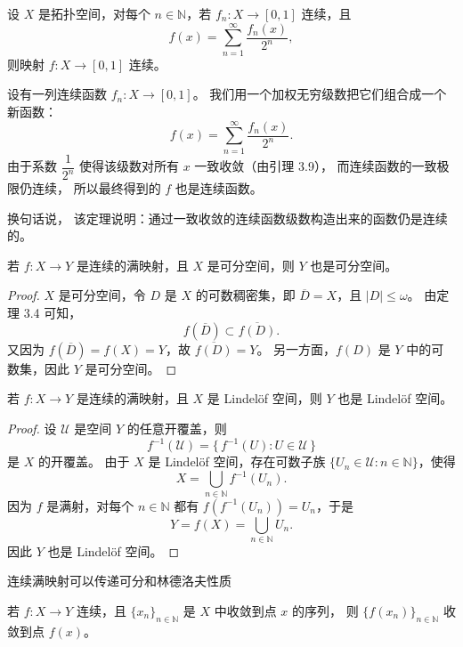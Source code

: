 \begin{theorem}[一致收敛的连续函数列的极限仍连续。]
设 $X$ 是拓扑空间，对每个 $n\in\mathbb{N}$，若 $f_n:X\to[0,1]$ 连续，且
\[
f(x)=\sum_{n=1}^{\infty}\frac{f_n(x)}{2^n},
\]
则映射 $f:X\to[0,1]$ 连续。
\end{theorem}
\begin{note}
    设有一列连续函数 $f_n:X\to[0,1]$。  
我们用一个加权无穷级数把它们组合成一个新函数：
\[
f(x)=\sum_{n=1}^{\infty}\frac{f_n(x)}{2^n}.
\]
由于系数 $\dfrac{1}{2^n}$ 使得该级数对所有 $x$ 一致收敛（由引理 3.9），  
而连续函数的一致极限仍连续，  
所以最终得到的 $f$ 也是连续函数。  

换句话说，  
该定理说明：通过一致收敛的连续函数级数构造出来的函数仍是连续的。
\end{note}
\begin{theorem}
若 $f:X\to Y$ 是连续的满映射，且 $X$ 是可分空间，则 $Y$ 也是可分空间。
\end{theorem}

\begin{proof}
$X$ 是可分空间，令 $D$ 是 $X$ 的可数稠密集，即 $\overline{D}=X$，且 $|D|\le\omega$。  
由定理 3.4 可知，
\[
f(\overline{D}) \subset \overline{f(D)}.
\]
又因为 $f(\overline{D}) = f(X) = Y$，故 $\overline{f(D)}=Y$。  
另一方面，$f(D)$ 是 $Y$ 中的可数集，因此 $Y$ 是可分空间。
\end{proof}
\begin{theorem}
若 $f:X\to Y$ 是连续的满映射，且 $X$ 是 Lindelöf 空间，则 $Y$ 也是 Lindelöf 空间。
\end{theorem}

\begin{proof}
设 $\mathcal{U}$ 是空间 $Y$ 的任意开覆盖，则
\[
f^{-1}(\mathcal{U})=\{\,f^{-1}(U):U\in\mathcal{U}\,\}
\]
是 $X$ 的开覆盖。  
由于 $X$ 是 Lindelöf 空间，存在可数子族 $\{U_n\in\mathcal{U}:n\in\mathbb{N}\}$，使得
\[
X=\bigcup_{n\in\mathbb{N}} f^{-1}(U_n).
\]
因为 $f$ 是满射，对每个 $n\in\mathbb{N}$ 都有 $f(f^{-1}(U_n))=U_n$，于是
\[
Y=f(X)=\bigcup_{n\in\mathbb{N}} U_n.
\]
因此 $Y$ 也是 Lindelöf 空间。
\end{proof}
\begin{note}
    连续满映射可以传递可分和林德洛夫性质
\end{note}
\begin{theorem}
若 $f:X\to Y$ 连续，且 $\{x_n\}_{n\in\mathbb{N}}$ 是 $X$ 中收敛到点 $x$ 的序列，  
则 $\{f(x_n)\}_{n\in\mathbb{N}}$ 收敛到点 $f(x)$。
\end{theorem}
